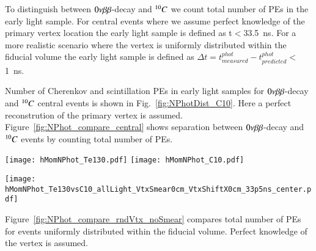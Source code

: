 To distinguish between $0\nu\beta\beta$-decay and $^{10}C$ we count total number of PEs in the 
early light sample. For central events where we assume perfect knowledge of the 
primary vertex location the early light sample is defined as t$<$33.5~ns. For a more 
realistic scenario where the vertex is uniformly distributed within the fiducial volume
the early light sample is defined as $\Delta t=t^{phot}_{measured} - 
t^{phot}_{predicted}<$1~ns.


Number of Cherenkov and scintillation PEs in early light samples for $0\nu\beta\beta$-decay and 
$^{10}C$ central events is shown in Fig.~\ref{fig:NPhotDist_C10}. Here a perfect 
reconstrution of the primary vertex is assumed. Figure~\ref{fig:NPhot_compare_central} shows
separation between $0\nu\beta\beta$-decay and $^{10}C$ events by counting total number of PEs. 

\begin{figure*}[ht]
  \centering
  \texttt{[image: hMomNPhot\_Te130.pdf]}
  \texttt{[image: hMomNPhot\_C10.pdf]}
  \caption{Early photons. Number of Cherenkov (\emph{dashed red line}), 
    scintillation
    (\emph{dotted blue line}), and total (\emph{solid black line}) PEs
    for the simulation of 1000 $^{130}$Te 0{\nbb} decay (left panel)
    and of 648 $^{10}$C (\emph{right panel}) events (1000 $^{10}$C events was 
    generated, but selected only those that has total energy deposition in the 
    detector in the 10\% energy range around Q-value.}
\label{fig:NPhotDist_C10}
\end{figure*}



\begin{figure*}[ht]
  \centering
  \texttt{[image: hMomNPhot\_Te130vsC10\_allLight\_VtxSmear0cm\_VtxShiftX0cm\_33p5ns\_center.pdf]}
  \caption{Comparison of total number of early photons between $^{130}$Te 0{\nbb} decay 
    and $^{10}$C events with energy deposition in the 10\% energy range around Q-value. 
    Events originated at the center of the sphere.
    Perfect vertex reconstruction - true vertex position is used. Time cut of 
    33.5~ns on the photon arrival time is applied.}
\label{fig:NPhot_compare_central}
\end{figure*}


Figure~\ref{fig:NPhot_compare_rndVtx_noSmear} compares total number of PEs for events uniformly 
distributed within the fiducial volume. Perfect knowledge of the vertex is assumed.


